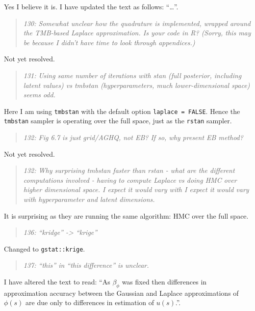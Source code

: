 \documentclass[
  12pt,
]{article}
\begin{document}
Yes I believe it is. I have updated the text as follows: ``\ldots{}''.

\begin{quote}
\emph{130: Somewhat unclear how the quadrature is implemented, wrapped
around the TMB-based Laplace approximation. Is your code in R? (Sorry,
this may be because I didn't have time to look through appendices.)}
\end{quote}

Not yet resolved.

\begin{quote}
\emph{131: Using same number of iterations with stan (full posterior,
including latent values) vs tmbstan (hyperparameters, much
lower-dimensional space) seems odd.}
\end{quote}

Here I am using \texttt{tmbstan} with the default option
\texttt{laplace\ =\ FALSE}. Hence the \texttt{tmbstan} sampler is
operating over the full space, just as the \texttt{rstan} sampler.

\begin{quote}
\emph{132: Fig 6.7 is just grid/AGHQ, not EB? If so, why present EB
method?}
\end{quote}

Not yet resolved.

\begin{quote}
\emph{132: Why surprising tmbstan faster than rstan - what are the
different computations involved - having to compute Laplace vs doing HMC
over higher dimensional space. I expect it would vary with I expect it
would vary with hyperparameter and latent dimensions.}
\end{quote}

It is surprising as they are running the same algorithm: HMC over the
full space.

\begin{quote}
\emph{136: ``kridge'' -\textgreater{} ``krige''}
\end{quote}

Changed to \texttt{gstat::krige}.

\begin{quote}
\emph{137: ``this'' in ``this difference'' is unclear.}
\end{quote}

I have altered the text to read: ``As \(\beta_\phi\) was fixed then
differences in approximation accuracy between the Gaussian and Laplace
approximations of \(\phi(s)\) are due only to differences in estimation
of \(u(s)\).''.
\end{document}
